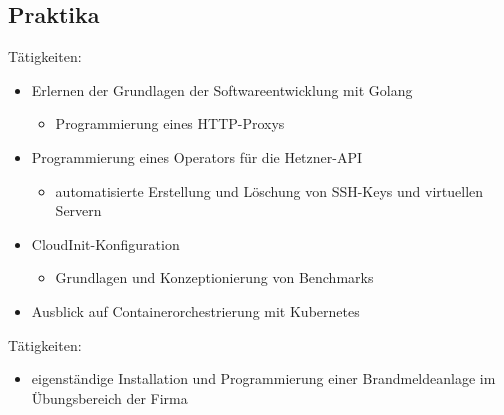 \documentclass[11pt,a4paper,sans]{moderncv}        %
\begin{document}
\subsection{Praktika}
\begin{adjustwidth}{6.5em}{1cm}
Tätigkeiten:
\begin{itemize}
\setlength\itemsep{0.05em}
\item Erlernen der Grundlagen der Softwareentwicklung mit Golang
  \begin{itemize}
  \item Programmierung eines HTTP-Proxys
  \end{itemize}
\item Programmierung eines Operators für die Hetzner-API
  \begin{itemize}
  \item automatisierte Erstellung und Löschung von SSH-Keys und virtuellen Servern
  \end{itemize}
\item CloudInit-Konfiguration
  \begin{itemize}
  \item Grundlagen und Konzeptionierung von Benchmarks
  \end{itemize}
  \item Ausblick auf Containerorchestrierung mit Kubernetes
\end{itemize}
\end{adjustwidth}
\vspace{0.5\baselineskip}
\begin{adjustwidth}{6.5em}{1cm}
Tätigkeiten:
\begin{itemize}
  \setlength\itemsep{0.05em}
  \item eigenständige Installation und Programmierung einer Brandmeldeanlage im Übungsbereich der Firma
\end{itemize}
\end{adjustwidth}
%
\end{document}
